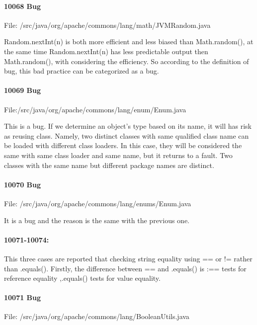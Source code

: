 \documentclass[12pt]{article}
\begin{document}
\paragraph{10068 Bug}
File: /src/java/org/apache/commons/lang/math/JVMRandom.java

Random.nextInt(n) is both more efficient and less biased than Math.random(), at the same time Random.nextInt(n) has less predictable output then Math.random(), with considering the efficiency. So according to the definition of bug, this bad practice can be categorized as a bug.

\paragraph{10069 Bug}
File:/src/java/org/apache/commons/lang/enum/Enum.java

This is a bug. If we determine an object's type based on its name, it will has risk as reusing class. Namely, two distinct classes with same qualified class name can be loaded with different class loaders. In this case, they will be considered the same with same class loader and same name, but it returns to a fault. Two classes with the same name but different package names are distinct.

\paragraph{10070 Bug}
File: /src/java/org/apache/commons/lang/enums/Enum.java

It is a bug and the reason is the same with the previous one.

\paragraph{10071-10074:} 
This three cases are reported that checking string equality using == or != rather than .equals(). Firstly, the difference between == and .equals() is :== tests for reference equality ,.equals() tests for value equality.

\paragraph{10071 Bug}
File: /src/java/org/apache/commons/lang/BooleanUtils.java
\end{document}
